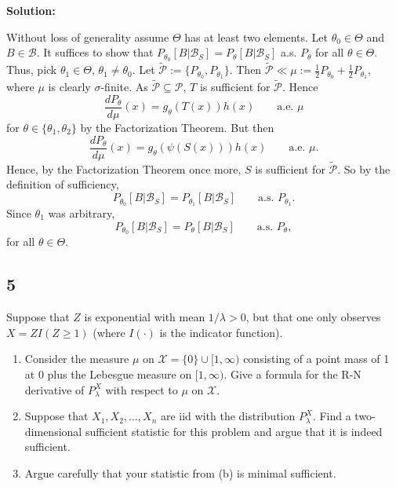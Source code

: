 \documentclass[12pt]{article}
\begin{document}
{\bf Solution:}

Without loss of generality assume $\Theta$ has at least two elements. 
Let $\theta_{0} \in \Theta$ and $B \in \mathcal{B}$. It suffices to show that $P_{\theta_{0}}[B | \mathcal{B}_{S}] = P_{\theta}[B | \mathcal{B}_{S}]$
a.s. $P_{\theta}$ for all $\theta \in \Theta$. Thus, pick $\theta_1 \in \Theta$, $\theta_1 \neq \theta_0$. Let $\tilde{\mathcal{P}} := \{P_{\theta_0}, P_{\theta_1}\}$.
Then $\tilde{\mathcal{P}} \ll \mu := \frac{1}{2}P_{\theta_0} + \frac{1}{2}P_{\theta_1}$, where $\mu$ is clearly $\sigma$-finite.
As $\tilde{\mathcal{P}} \subseteq \mathcal{P}$, $T$ is sufficient for $\tilde{\mathcal{P}}$. Hence
\[
  \frac{dP_{\theta}}{d\mu}(x) = g_{\theta}(T(x))h(x) \qquad \text{a.e. } \mu
\]
for $\theta \in \{\theta_{1}, \theta_2\}$ by the Factorization Theorem. But then
\[
  \frac{dP_{\theta}}{d\mu}(x) = g_{\theta}(\psi(S(x)))h(x) \qquad \text{a.e. } \mu.
\]
Hence, by the Factorization Theorem once more, $S$ is sufficient for $\tilde{\mathcal{P}}$. So by the definition of sufficiency,
\[ P_{\theta_0}[B|\mathcal{B}_{S}] = P_{\theta_1}[B|\mathcal{B}_{S}] \qquad \text{a.s. } P_{\theta_{1}}. \]
Since $\theta_{1}$ was arbitrary,
\[ P_{\theta_{0}}[B | \mathcal{B}_{S}] = P_{\theta}[B | \mathcal{B}_{S}] \qquad \text{a.s. } P_{\theta},\]
for all $\theta \in \Theta$.



\newpage
\subsection*{5}
\begin{tcolorbox}
  Suppose that $Z$ is exponential with mean $1/\lambda>0$, but that one only observes $X = Z I(Z \geq 1)$ (where $I(\cdot)$ is the indicator function).
  \begin{enumerate}
    \item Consider the measure $\mu$ on $\mathcal{X} = \{0\}\cup [1,\infty)$ consisting of a point mass of 1 at 0 plus the Lebesgue measure on $[1,\infty)$.  Give a formula for the R-N derivative of $P_\lambda^X$ with respect to $\mu$ on $\mathcal{X}$.
    \item Suppose that $X_1,X_2,\ldots,X_n$ are iid with the distribution $P_\lambda^X$.  Find a two-dimensional sufficient statistic for this problem and argue that it is indeed sufficient.
    \item Argue carefully that your statistic from (b) is minimal sufficient.
  \end{enumerate}
\end{tcolorbox}
\end{document}
